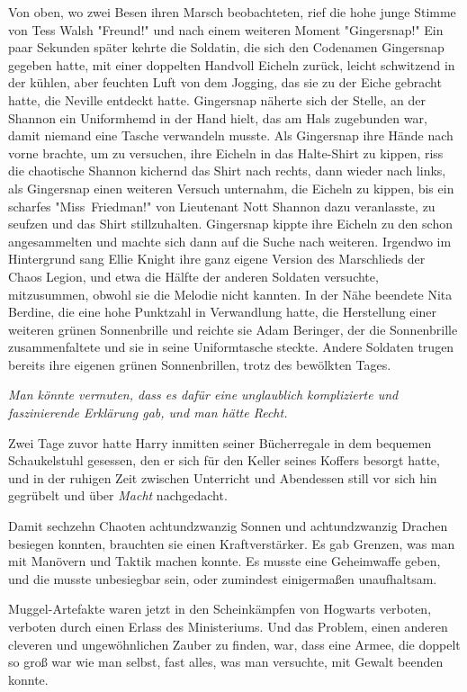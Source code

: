 {Von oben, wo zwei Besen ihren Marsch beobachteten, rief die hohe junge Stimme von Tess Walsh "Freund!" und nach einem weiteren Moment "Gingersnap!" Ein paar Sekunden später kehrte die Soldatin, die sich den Codenamen Gingersnap gegeben hatte, mit einer doppelten Handvoll Eicheln zurück, leicht schwitzend in der kühlen, aber feuchten Luft von dem Jogging, das sie zu der Eiche gebracht hatte, die Neville entdeckt hatte. Gingersnap näherte sich der Stelle, an der Shannon ein Uniformhemd in der Hand hielt, das am Hals zugebunden war, damit niemand eine Tasche verwandeln musste. Als Gingersnap ihre Hände nach vorne brachte, um zu versuchen, ihre Eicheln in das Halte-Shirt zu kippen, riss die chaotische Shannon kichernd das Shirt nach rechts, dann wieder nach links, als Gingersnap einen weiteren Versuch unternahm, die Eicheln zu kippen, bis ein scharfes "Miss~Friedman!" von Lieutenant Nott Shannon dazu veranlasste, zu seufzen und das Shirt stillzuhalten. Gingersnap kippte ihre Eicheln zu den schon angesammelten und machte sich dann auf die Suche nach weiteren. Irgendwo im Hintergrund sang Ellie Knight ihre ganz eigene Version des Marschlieds der Chaos Legion, und etwa die Hälfte der anderen Soldaten versuchte, mitzusummen, obwohl sie die Melodie nicht kannten. In der Nähe beendete Nita Berdine, die eine hohe Punktzahl in Verwandlung hatte, die Herstellung einer weiteren grünen Sonnenbrille und reichte sie Adam Beringer, der die Sonnenbrille zusammenfaltete und sie in seine Uniformtasche steckte. Andere Soldaten trugen bereits ihre eigenen grünen Sonnenbrillen, trotz des bewölkten Tages.

\emph{Man könnte vermuten, dass es dafür eine unglaublich komplizierte und faszinierende Erklärung gab, und man hätte Recht.}

Zwei Tage zuvor hatte Harry inmitten seiner Bücherregale in dem bequemen Schaukelstuhl gesessen, den er sich für den Keller seines Koffers besorgt hatte, und in der ruhigen Zeit zwischen Unterricht und Abendessen still vor sich hin gegrübelt und über \emph{Macht} nachgedacht.

Damit sechzehn Chaoten achtundzwanzig Sonnen und achtundzwanzig Drachen besiegen konnten, brauchten sie einen Kraftverstärker. Es gab Grenzen, was man mit Manövern und Taktik machen konnte. Es musste eine Geheimwaffe geben, und die musste unbesiegbar sein, oder zumindest einigermaßen unaufhaltsam.

Muggel-Artefakte waren jetzt in den Scheinkämpfen von Hogwarts verboten, verboten durch einen Erlass des Ministeriums. Und das Problem, einen anderen cleveren und ungewöhnlichen Zauber zu finden, war, dass eine Armee, die doppelt so groß war wie man selbst, fast alles, was man versuchte, mit Gewalt beenden konnte.

}
